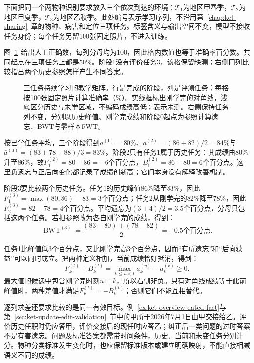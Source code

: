 下面把同一个两物种识别要求放入三个依次到达的环境：$\mathcal T_1$为地区甲春季，$\mathcal T_2$为地区甲夏季，$\mathcal T_3$为地区乙秋季。此处编号表示学习序列，不沿用第~\ref{chap:ket-sharing}~章的物种、病害和定位三项任务。标签含义与输出空间不变，模型不接收任务身份；每个任务另留100张固定照片，不进入训练。

图~\ref{fig:ket-evaluation-matrix}~给出人工正确数，每列分母均为100，因此格内数值也等于准确率百分数。共同起点在三项任务上都是50\%。阶段1没有评价任务3，该格保留缺测；右侧同列比较指出两个历史参照怎样产生不同答案。

\begin{figure}[htbp]
  \centering
  
  \caption{三任务持续学习的教学矩阵。行是完成的阶段，列是评测任务；每格按100张固定照片计算准确率（\%）。实线框标出刚学完的对角线，浅底区分历史与未学区域，不编码成绩高低；\textemdash 表示未测。右侧保持任务列不变，分别以历史峰值、刚学完成绩和阶段0起点为参照计算遗忘、BWT与零样本FWT。}
  \label{fig:ket-evaluation-matrix}
\end{figure}

按已学任务平均，三个阶段得到$\bar a^{(1)}=80\%$、$\bar a^{(2)}=(86+82)/2=84\%$与$\bar a^{(3)}=(83+78+88)/3=83\%$。阶段2只有任务1属于历史任务：其成绩由80\%升至86\%，故$F_1^{(2)}=80-86=-6$个百分点，$B_1^{(2)}=86-80=6$个百分点。这里负遗忘与正后向变化都记录了成绩创新高；它们本身没有解释改善机制。

\begin{samepage}
阶段3要比较两个历史任务。任务1的历史峰值86\%降至83\%，因此$F_1^{(3)}=\max(80,86)-83=3$个百分点；任务2从刚学完的82\%降至78\%，因此$F_2^{(3)}=82-78=4$个百分点。平均遗忘为$(3+4)/2=3.5$个百分点，分母只包括这两个任务。若把参照改为各自刚学完的成绩，得到：
\[
  \operatorname{BWT}^{(3)}
  =\frac{(83-80)+(78-82)}2
  =-0.5\text{个百分点}.
\]

\end{samepage}
任务1比峰值低3个百分点，又比刚学完高3个百分点，因而“有所遗忘”和“后向获益”可以同时成立。把两种定义相加，当前成绩恰好抵消，得到：
\[
  F_k^{(t)}+B_k^{(t)}
  =\max_{k\leq u<t}a_k^{(u)}-a_k^{(k)}\geq0.
\]
最大值的候选中包含刚学完时刻$u=k$，所以右侧非负。只有对角线成绩等于此前峰值时，两种差值才满足$F_k^{(t)}=-B_k^{(t)}$；否则它们不能互相替代。

逐列求差还要求比较的是同一有效目标。例~\ref{ex:ket-overview-dated-fact}与第~\ref{sec:ket-update-edit-validation}~节中的甲所于2026年7月1日由甲交接给乙。评价历史任职时仍应答甲，评价交接后的现任时应答乙；纠正后一类问题的过时答案不是有害遗忘。问题及标准答案都需带时间条件，历史、当前和未变任务分别计分。物种分类标准发生变化时，也应保留标准版本或建立明确映射，不能直接相减语义不同的成绩。

